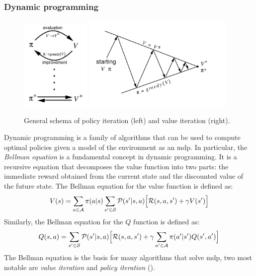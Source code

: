 \subsubsection{Dynamic programming}
\begin{figure}
  \includegraphics[width=0.3\textwidth]{chapters/img/generalized-policy-improvement.png}
  \includegraphics[width=0.65\textwidth]{chapters/img/value-iteration.png}
  \caption{General schema of policy iteration (left) and value iteration (right).}\label{fig:rl:dp}
\end{figure}
Dynamic programming is a family of algorithms that can be used to compute optimal policies 
 given a model of the environment as an \ac{mdp}.
%
In particular, the \emph{Bellman equation} is a fundamental concept in dynamic programming. 
 It is a recursive equation that decomposes the value function into two parts: 
 the immediate reward obtained from the current state and the discounted value of the future state. 
 The Bellman equation for the value function is defined as:
\begin{equation}
V(s) = \sum_{a \in \mathcal{A}} \pi(a|s) \sum_{s' \in \mathcal{S}} \mathcal{P}(s'|s, a) \Big[ \mathcal{R}(s, a, s') + \gamma V(s') \Big]
\end{equation}
%
Similarly, the Bellman equation for the $Q$ function is defined as:
\begin{equation}
Q(s, a) = \sum_{s' \in \mathcal{S}} \mathcal{P}(s'|s, a) \Big[ \mathcal{R}(s, a, s') + \gamma \sum_{a' \in \mathcal{A}} \pi(a'|s') Q(s', a') \Big]
\end{equation}
%
The Bellman equation is the basis for many algorithms that solve \ac{mdp},
two most notable are \emph{value iteration} and \emph{policy iteration} ().
